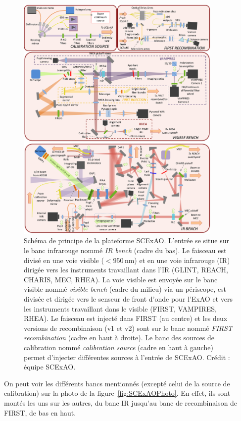 \begin{figure}[ht!]
    \centering
    \includegraphics[width=0.89\textwidth]{Figure_Chap5/20230212_FullBench.pdf}
    \caption[Schéma de principe de la plateforme SCExAO.]{Schéma de principe de la plateforme SCExAO. L'entrée se situe sur le banc infrarouge nommé \textit{IR bench} (cadre du bas). Le faisceau est divisé en une voie visible ($< 950 \,$nm) et en une voie infrarouge (IR) dirigée vers les instruments travaillant dans l'IR (GLINT, REACH, CHARIS, MEC, RHEA). La voie visible est envoyée sur le banc visible nommé \textit{visible bench} (cadre du milieu) via un périscope, est divisée et dirigée vers le senseur de front d'onde pour l'ExAO et vers les instruments travaillant dans le visible (FIRST, VAMPIRES, RHEA). Le faisceau est injecté dans FIRST (au centre) et les deux versions de recombinaison (v1 et v2) sont sur le banc nommé \textit{FIRST recombination} (cadre en haut à droite). Le banc des sources de calibration nommé \textit{calibration source} (cadre en haut à gauche) permet d'injecter différentes sources à l'entrée de SCExAO. Crédit : équipe SCExAO.}
    \label{fig:SCExAOScheme}
\end{figure}

On peut voir les différents bancs mentionnés (excepté celui de la source de calibration) sur la photo de la figure~\ref{fig:SCExAOPhoto}. En effet, ils sont montés les uns sur les autres, du banc \ac{IR} jusqu'au banc de recombinaison de \ac{FIRST}, de bas en haut.


